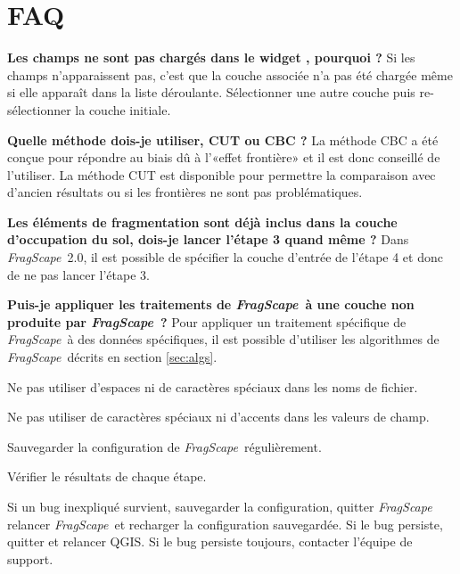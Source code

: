 \documentclass[11pt]{article}
\newcommand{\tool}{\emph{FragScape}}
\let\tempone\itemize
\let\temptwo\enditemize
\renewenvironment{itemize}{\tempone\addtolength{\itemsep}{-0.5\baselineskip}}{\temptwo}
\begin{document}
\section{FAQ}

\begin{itemize}
\item \textbf{Les champs ne sont pas chargés dans le widget , pourquoi ?} Si les champs n'apparaissent pas, c'est que la couche associée n'a pas été chargée même si elle apparaît dans la liste déroulante. Sélectionner une autre couche puis re-sélectionner la couche initiale.

\item \textbf{Quelle méthode dois-je utiliser, CUT ou CBC ?} La méthode CBC a été conçue pour répondre au biais dû à l'«effet frontière» et il est donc conseillé de l'utiliser. La méthode CUT est disponible pour permettre la comparaison avec d'ancien résultats ou si les frontières ne sont pas problématiques.

\item \textbf{Les éléments de fragmentation sont déjà inclus dans la couche d'occupation du sol, dois-je lancer l'étape 3 quand même ?} Dans \tool\ 2.0, il est possible de spécifier la couche d'entrée de l'étape 4 et donc de ne pas lancer l'étape 3.

\item \textbf{Puis-je appliquer les traitements de \tool\ à une couche non produite par \tool\ ?} Pour appliquer un traitement spécifique de \tool\ à des données spécifiques, il est possible d'utiliser les algorithmes de \tool\ décrits en section \ref{sec:algs}.

\end{itemize}

\begin{itemize}
    \item Ne pas utiliser d'espaces ni de caractères spéciaux dans les noms de fichier.
    \item Ne pas utiliser de caractères spéciaux ni d'accents dans les valeurs de champ.
    \item Sauvegarder la configuration de \tool\ régulièrement.
    \item Vérifier le résultats de chaque étape.
    \item Si un bug inexpliqué survient, sauvegarder la configuration, quitter \tool\, relancer \tool\ et recharger la configuration sauvegardée. Si le bug persiste, quitter et relancer QGIS. Si le bug persiste toujours, contacter l'équipe de support.
\end{itemize}
\frameboxend
\end{document}
